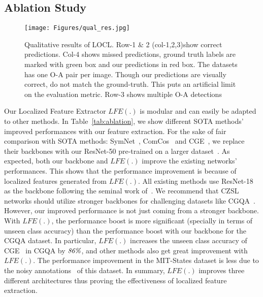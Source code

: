 \documentclass{bmvc2k}
\begin{document}
\vspace{-0.1cm}
\subsection{Ablation Study}
\vspace{-0.1cm}
\begin{figure*}[h]
\begin{center}
\texttt{[image: Figures/qual\_res.jpg]}
\end{center}
\vspace{-0.4cm}
   \caption{Qualitative results of LOCL. Row-1 \& 2 (col-1,2,3)show correct predictions. Col-4 shows missed predictions, ground truth labels are marked with green box and our predictions in red box. The datasets has one O-A pair per image. Though our predictions are visually correct, do not match the ground-truth. This puts an artificial limit on the evaluation metric. Row-3 shows multiple O-A detections}
\vspace{-0.2cm}
\label{fig:Qual-Results1}
\end{figure*}



 Our Localized Feature Extractor $LFE(.)$ is modular and can easily be adapted to other methods. In Table~\ref{tab:ablation}, we show different SOTA methods' improved performances with our feature extraction. 
For the sake of fair comparison with SOTA methods: SymNet~\cite{li2020symmetry}, ComCos~\cite{mancini2021learning} and CGE~\cite{naeem2021learning}, we replace their backbones with our ResNet-50 pre-trained on a larger dataset~\cite{radford2021learning}. 
As expected, both our backbone and $LFE(.)$ improve the existing networks' performances. This shows that the performance improvement is because of localized features generated from $LFE(.)$.
All existing methods use ResNet-18 as the backbone following the seminal work of~\cite{misra2017red}. 
We recommend that CZSL networks should utilize stronger backbones for challenging datasets like CGQA~\cite{naeem2021learning}. 
However, our improved performance is not just coming from a stronger backbone. 
With $LFE(.)$, the performance boost is more significant (specially in terms of unseen class accuracy) than the performance boost with our backbone for the CGQA dataset. 
In particular, $LFE(.)$ increases the unseen class accuracy of CGE~\cite{naeem2021learning} in CGQA by $\emph{86\%}$, and other methods also get great improvement with $LFE(.)$. 
The performance improvement in the MIT-States dataset is less due to the noisy annotations~\cite{Atzmon_casual} of this dataset.  
In summary, $LFE(.)$ improves three different architectures thus proving the effectiveness of localized feature extraction. 
\end{document}
